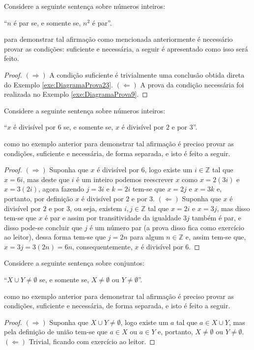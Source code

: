 \begin{exemplo}\label{exe:ProvaIff1}
	Considere a seguinte sentença sobre números inteiros:
	\begin{center}
		``$n$ é par se, e somente se, $n^2$ é par''.
	\end{center}
	para demonstrar tal afirmação como mencionada anteriormente é necessário provar as condições: suficiente e necessária, a seguir é apresentado como isso será feito.
	\begin{proof}
		$(\Rightarrow)$ A condição suficiente é trivialmente uma conclusão obtida direta do Exemplo \ref{exe:DiagramaProva23}. $(\Leftarrow)$ A prova da condição necessária foi realizada no Exemplo \ref{exe:DiagramaProva9}.
	\end{proof}
\end{exemplo}

\begin{exemplo}\label{exe:ProvaIff2}
	Considere a seguinte sentença sobre números inteiros:
	\begin{center}
		``$x$ é divisível por $6$ se, e somente se, $x$ é divisível por $2$ e por $3$''.
	\end{center}
	como no exemplo anterior para demonstrar tal afirmação é preciso provar as condições, suficiente e necessária, de forma separada, e isto é feito a seguir.
	\begin{proof}
		$(\Rightarrow)$ Suponha que $x$ é divisível por $6$, logo existe um $i \in \mathbb{Z}$ tal que $x = 6i$, mas deste que $i$ é um inteiro podemos reescrever $x$ como $x = 2(3i)$ e $x = 3(2i)$, agora fazendo $j = 3i$ e $k = 2i$ tem-se que $x = 2j$ e $x = 3k$ e, portanto, por definição $x$ é divisível por $2$ e por $3$. $(\Leftarrow)$ Suponha que $x$ é divisível por $2$ e por $3$, ou seja, existem $i, j \in \mathbb{Z}$ tal que $x = 2i$ e $x = 3j$, mas disso tem-se que $x$ é par e assim por transitividade da igualdade $3j$ também é par, e disso pode-se concluir que $j$ é um número par (a prova disso fica como exercício ao leitor), dessa forma tem-se que $j = 2n$ para algum $n \in \mathbb{Z}$ e, assim tem-se que, $x = 3j = 3(2n) = 6n$, consequentemente, $x$ é divisível por $6$.
	\end{proof}
\end{exemplo}

\begin{exemplo}\label{exe:ProvaIff3}
	Considere a seguinte sentença sobre conjuntos:
	\begin{center}
		``$X \cup Y \neq \emptyset$ se, e somente se, $X \neq \emptyset$ ou $Y \neq \emptyset$''.
	\end{center}
	como no exemplo anterior para demonstrar tal afirmação é preciso provar as condições, suficiente e necessária, de forma separada, e isto é feito a seguir.
	\begin{proof}
		$(\Rightarrow)$ Suponha que $X \cup Y \neq \emptyset$, logo existe um $a$ tal que $a \in X \cup Y$, mas pela definição de união tem-se que $a \in X$ ou $a \in Y$ e, portanto, $X \neq \emptyset$ ou $Y \neq \emptyset$. $(\Leftarrow)$ Trivial, ficando com exercício ao leitor.
	\end{proof}
\end{exemplo}

